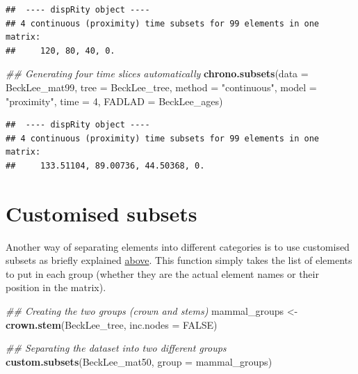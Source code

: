 \documentclass[]{book}
\newenvironment{Shaded}{\begin{snugshade}}{\end{snugshade}}
\newcommand{\CommentTok}[1]{\textcolor[rgb]{0.56,0.35,0.01}{\textit{#1}}}
\newcommand{\DataTypeTok}[1]{\textcolor[rgb]{0.13,0.29,0.53}{#1}}
\newcommand{\DecValTok}[1]{\textcolor[rgb]{0.00,0.00,0.81}{#1}}
\newcommand{\KeywordTok}[1]{\textcolor[rgb]{0.13,0.29,0.53}{\textbf{#1}}}
\newcommand{\NormalTok}[1]{#1}
\newcommand{\OtherTok}[1]{\textcolor[rgb]{0.56,0.35,0.01}{#1}}
\newcommand{\StringTok}[1]{\textcolor[rgb]{0.31,0.60,0.02}{#1}}
\begin{document}
\begin{verbatim}
##  ---- dispRity object ---- 
## 4 continuous (proximity) time subsets for 99 elements in one matrix:
##     120, 80, 40, 0.
\end{verbatim}

\begin{Shaded}
\begin{Highlighting}[]
\CommentTok{## Generating four time slices automatically}
\KeywordTok{chrono.subsets}\NormalTok{(}\DataTypeTok{data =}\NormalTok{ BeckLee_mat99, }\DataTypeTok{tree =}\NormalTok{ BeckLee_tree,}
               \DataTypeTok{method =} \StringTok{"continuous"}\NormalTok{, }\DataTypeTok{model =} \StringTok{"proximity"}\NormalTok{,}
               \DataTypeTok{time =} \DecValTok{4}\NormalTok{, }\DataTypeTok{FADLAD =}\NormalTok{ BeckLee_ages)}
\end{Highlighting}
\end{Shaded}

\begin{verbatim}
##  ---- dispRity object ---- 
## 4 continuous (proximity) time subsets for 99 elements in one matrix:
##     133.51104, 89.00736, 44.50368, 0.
\end{verbatim}

\hypertarget{custom-subsets}{%
\section{Customised subsets}\label{custom-subsets}}

Another way of separating elements into different categories is to use customised subsets as briefly explained \protect\hyperlink{disparity-among-groups}{above}.
This function simply takes the list of elements to put in each group (whether they are the actual element names or their position in the matrix).

\begin{Shaded}
\begin{Highlighting}[]
\CommentTok{## Creating the two groups (crown and stems)}
\NormalTok{mammal_groups <-}\StringTok{ }\KeywordTok{crown.stem}\NormalTok{(BeckLee_tree, }\DataTypeTok{inc.nodes =} \OtherTok{FALSE}\NormalTok{)}

\CommentTok{## Separating the dataset into two different groups}
\KeywordTok{custom.subsets}\NormalTok{(BeckLee_mat50, }\DataTypeTok{group =}\NormalTok{ mammal_groups)}
\end{Highlighting}
\end{Shaded}
\end{document}
